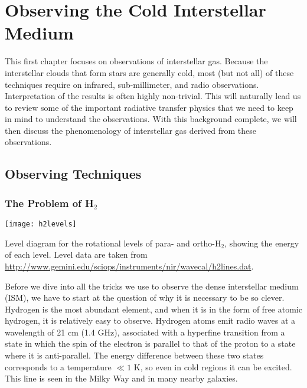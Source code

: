\chapter{Observing the Cold Interstellar Medium}
\label{ch:obscold}


This first chapter focuses on observations of interstellar gas. Because the interstellar clouds that form stars are generally cold, most (but not all) of these techniques require on infrared, sub-millimeter, and radio observations. Interpretation of the results is often highly non-trivial. This will naturally lead us to review some of the important radiative transfer physics that we need to keep in mind to understand the observations. With this background complete, we will then discuss the phenomenology of interstellar gas derived from these observations.

\section{Observing Techniques}

\subsection{The Problem of H$_2$}

\begin{marginfigure}
\texttt{[image: h2levels]}
\caption[H$_2$ level diagram]{
\label{fig:h2levels}
Level diagram for the rotational levels of para- and ortho-H$_2$, showing the energy of each level. Level data are taken from \url{http://www.gemini.edu/sciops/instruments/nir/wavecal/h2lines.dat}.
}
\end{marginfigure}

Before we dive into all the tricks we use to observe the dense interstellar medium (ISM), we have to start at the question of why it is necessary to be so clever. Hydrogen is the most abundant element, and when it is in the form of free atomic hydrogen, it is relatively easy to observe. Hydrogen atoms emit radio waves at a wavelength of 21 cm (1.4 GHz), associated with a hyperfine transition from a state in which the spin of the electron is parallel to that of the proton to a state where it is anti-parallel. The energy difference between these two states corresponds to a temperature $\ll 1$ K, so even in cold regions it can be excited. This line is seen in the Milky Way and in many nearby galaxies.
  
